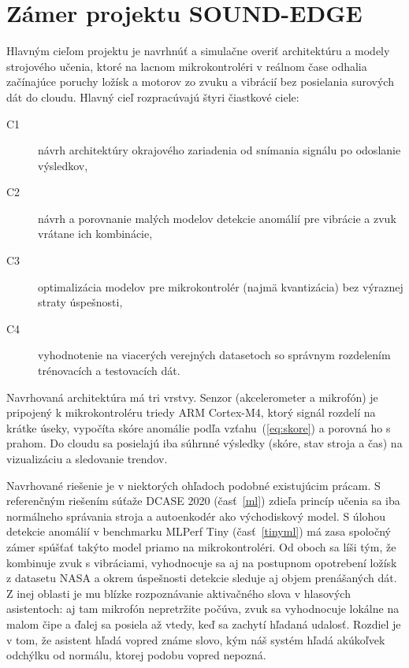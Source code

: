 \documentclass[10pt,twoside,slovak,a4paper]{article}
\begin{document}
\section{Zámer projektu SOUND-EDGE} \label{zamer}

Hlavným cieľom projektu je navrhnúť a simulačne overiť architektúru a modely strojového učenia, ktoré na lacnom mikrokontroléri v reálnom čase odhalia začínajúce poruchy ložísk a motorov zo zvuku a vibrácií bez posielania surových dát do cloudu. Hlavný cieľ rozpracúvajú štyri čiastkové ciele:

\begin{description}
\item[C1] návrh architektúry okrajového zariadenia od snímania signálu po odoslanie výsledkov,
\item[C2] návrh a porovnanie malých modelov detekcie anomálií pre vibrácie a zvuk vrátane ich kombinácie,
\item[C3] optimalizácia modelov pre mikrokontrolér (najmä kvantizácia) bez výraznej straty úspešnosti,
\item[C4] vyhodnotenie na viacerých verejných datasetoch so správnym rozdelením trénovacích a testovacích dát.
\end{description}

Navrhovaná architektúra má tri vrstvy. Senzor (akcelerometer a mikrofón) je pripojený k mikrokontroléru triedy ARM Cortex-M4, ktorý signál rozdelí na krátke úseky, vypočíta skóre anomálie podľa vzťahu~(\ref{eq:skore}) a porovná ho s prahom. Do cloudu sa posielajú iba súhrnné výsledky (skóre, stav stroja a čas) na vizualizáciu a sledovanie trendov.

Navrhované riešenie je v niektorých ohľadoch podobné existujúcim prácam. S referenčným riešením súťaže DCASE 2020 (časť~\ref{ml}) zdieľa princíp učenia sa iba normálneho správania stroja a autoenkodér ako východiskový model. S úlohou detekcie anomálií v benchmarku MLPerf Tiny (časť~\ref{tinyml}) má zasa spoločný zámer spúšťať takýto model priamo na mikrokontroléri. Od oboch sa líši tým, že kombinuje zvuk s vibráciami, vyhodnocuje sa aj na postupnom opotrebení ložísk z datasetu NASA a okrem úspešnosti detekcie sleduje aj objem prenášaných dát. Z inej oblasti je mu blízke rozpoznávanie aktivačného slova v hlasových asistentoch: aj tam mikrofón nepretržite počúva, zvuk sa vyhodnocuje lokálne na malom čipe a ďalej sa posiela až vtedy, keď sa zachytí hľadaná udalosť. Rozdiel je v tom, že asistent hľadá vopred známe slovo, kým náš systém hľadá akúkoľvek odchýlku od normálu, ktorej podobu vopred nepozná.
\end{document}
